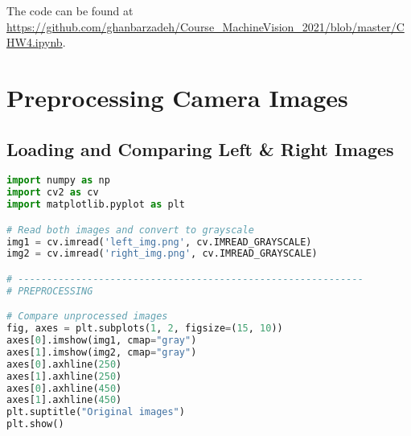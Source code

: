





\maketitle 
The code can be found at \url{https://github.com/ghanbarzadeh/Course_MachineVision_2021/blob/master/CHW4.ipynb}.
\section*{Preprocessing Camera Images}

\subsection*{Loading and Comparing Left \& Right Images}

\begin{center}{\begin{minipage}{0.9\linewidth}
\begin{lstlisting}[language=Python, basicstyle=\fontsize{8}{10}\selectfont\ttfamily]
import numpy as np
import cv2 as cv
import matplotlib.pyplot as plt

# Read both images and convert to grayscale
img1 = cv.imread('left_img.png', cv.IMREAD_GRAYSCALE)
img2 = cv.imread('right_img.png', cv.IMREAD_GRAYSCALE)

# ------------------------------------------------------------
# PREPROCESSING

# Compare unprocessed images
fig, axes = plt.subplots(1, 2, figsize=(15, 10))
axes[0].imshow(img1, cmap="gray")
axes[1].imshow(img2, cmap="gray")
axes[0].axhline(250)
axes[1].axhline(250)
axes[0].axhline(450)
axes[1].axhline(450)
plt.suptitle("Original images")
plt.show()
\end{lstlisting}
\end{minipage}}\end{center}

